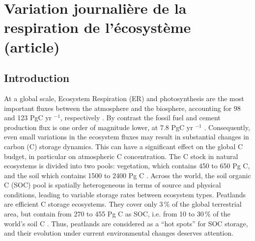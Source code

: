 \singlespacing
\chapter{Variation journalière de la respiration de l'écosystème (article)}
\label{ch:ch5}

\minitoc

\newpage

\doublespacing
\section{Introduction}
At a global scale, Ecosystem Respiration (ER) and photosynthesis are the most important fluxes between the atmosphere and the biosphere, accounting for 98 and 123 PgC yr $^{-1}$, respectively \citep{Bond-Lamberty2010,Beer2010}. 
By contrast the fossil fuel and cement production flux is one order of magnitude lower, at 7.8 PgC yr $^{-1}$ \citep{Ciais2014}.
Consequently, even small variations in the ecosystem fluxes may result in substantial changes in carbon (C) storage dynamics.
This can have a significant effect on the global C budget, in particular on atmospheric C concentration.
The C stock in natural ecosystems is divided into two pools: vegetation, which contains 450 to 650 Pg C, and the soil which contains 1500 to 2400 Pg C \citep{prentice2001,Eswaran1993,batjes1996}.
Across the world, the soil organic C (SOC) pool is spatially heterogeneous in terms of source and physical conditions, leading to variable storage rates between ecosystem types.
Peatlands are efficient C storage ecosystems.
They cover only 3\,\% of the global terrestrial area, but contain from 270 to 455 Pg C as SOC, i.e. from 10 to 30\,\% of the world's soil C \citep{gorham1991, turunen2002}.
Thus, peatlands are considered as a “hot spots” for SOC storage, and their evolution under current environmental changes deserves attention.

